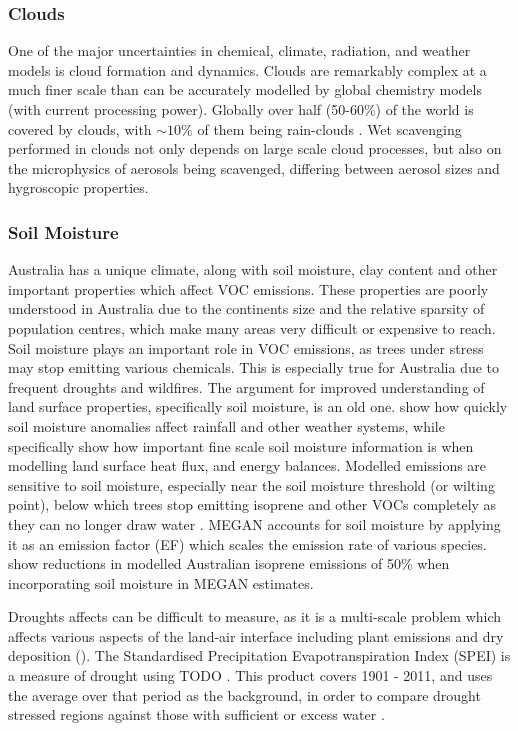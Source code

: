     \subsubsection{Clouds}
      \label{LR:Models:Unc:Clouds}
      One of the major uncertainties in chemical, climate, radiation, and weather models is cloud formation and dynamics.
      Clouds are remarkably complex at a much finer scale than can be accurately modelled by global chemistry models (with current processing power).
      Globally over half (50-60\%) of the world is covered by clouds, with $\sim10\%$ of them being rain-clouds \citep{Kanakidou2005}.
      Wet scavenging performed in clouds not only depends on large scale cloud processes, but also on the microphysics of aerosols being scavenged, differing between aerosol sizes and hygroscopic properties.
      
    \subsubsection{Soil Moisture}
      \label{LR:Models:Unc:SoilMoisture}
      Australia has a unique climate, along with soil moisture, clay content and other important properties which affect VOC emissions.
      These properties are poorly understood in Australia due to the continents size and the relative sparsity of population centres, which make many areas very difficult or expensive to reach.
      Soil moisture plays an important role in VOC emissions, as trees under stress may stop emitting various chemicals. 
      This is especially true for Australia due to frequent droughts and wildfires.
      The argument for improved understanding of land surface properties, specifically soil moisture, is an old one\citep{Mintz1982, Rowntree1983, Chen2001}. 
      \cite{Rowntree1983} show how quickly soil moisture anomalies affect rainfall and other weather systems, while \cite{Chen2001} specifically show how important fine scale soil moisture information is when modelling land surface heat flux, and energy balances.
      Modelled emissions are sensitive to soil moisture, especially near the soil moisture threshold (or wilting point), below which trees stop emitting isoprene and other VOCs completely as they can no longer draw water \citep{Bauwens2016}.
      MEGAN accounts for soil moisture by applying it as an emission factor (EF) which scales the emission rate of various species.
      \cite{Sindelarova2014} show reductions in modelled Australian isoprene emissions of 50\% when incorporating soil moisture in MEGAN estimates. 
      
      Droughts affects can be difficult to measure, as it is a multi-scale problem which affects various aspects of the land-air interface including plant emissions and dry deposition (\cite{Wang2017}).
      The Standardised Precipitation Evapotranspiration Index (SPEI) is a measure of drought using TODO \cite{SPEI_website}.
      This product covers 1901 - 2011, and uses the average over that period as the background, in order to compare drought stressed regions against those with sufficient or excess water \cite{SPEI_website}.
      
